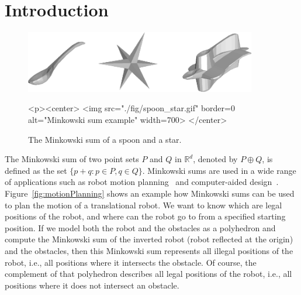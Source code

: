 
\ccParDims




\section{Introduction}

\begin{figure}[h]
  \begin{ccTexOnly}
    \begin{center}
      \includegraphics[width=0.9\textwidth]{Minkowski_sum_3/fig/spoon_star}
    \end{center}
  \end{ccTexOnly}
  \begin{ccHtmlOnly}
    <p><center>
    <img src="./fig/spoon_star.gif" border=0 alt="Minkowski sum
    example" width=700>
    </center>
  \end{ccHtmlOnly}
  \caption{The Minkowski sum of a spoon and a star.}
  \label{fig:spoonStar}
\end{figure}

The Minkowski sum of two point sets $P$ and $Q$ in $\mathbb{R}^d$, denoted by
$P \oplus Q$, is defined as the set $\{p+q:p \in P, q \in Q
\}$. Minkowski sums are used in a wide range of applications such as
robot motion planning~\cite{l-rmp-91} and computer-aided
design~\cite{cgal:ek-sicad-99}. Figure~\ref{fig:motionPlanning} shows
an example how Minkowski sums can be used to plan the motion of a
translational robot. We want to know which are legal positions of the
robot, and where can the robot go to from a specified starting
position. If we model both the robot and the obstacles as a polyhedron
and compute the Minkowski sum of the inverted robot (robot reflected
at the origin) and the obstacles, then this Minkowski sum represents
all illegal positions of the robot, i.e., all positions where it
intersects the obstacle. Of course, the complement of that polyhedron
describes all legal positions of the robot, i.e., all positions where
it does not intersect an obstacle.


